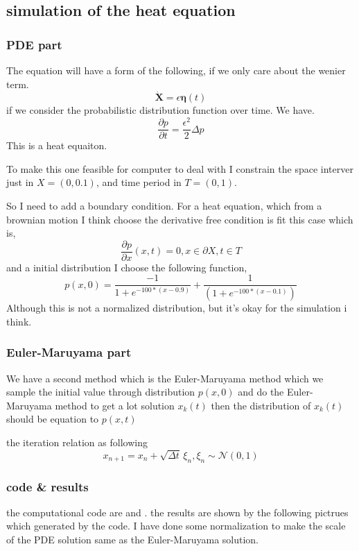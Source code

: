 \documentclass{article}
\theoremstyle{definition} %
\begin{document}
\subsection{simulation of the heat equation}
\subsubsection{PDE part}
The equation will have a form of the following,
if we only care about the wenier term.
\[
    \dot{\mathbf{X}} =  \epsilon\boldsymbol{\eta}(t)
\]
if we consider the probabilistic distribution function
over time. We have.
\[
    \frac{\partial p}{\partial t} = \frac{\epsilon^2}{2}  \Delta p
\]
This is a heat equaiton.

To make this one feasible for computer to
deal with I constrain the space interver
just in \(X=(0,0.1)\), and time period in
\(T=(0,1)\).

So I need to add a boundary condition.
For a heat equation, which from a brownian
motion I think choose the derivative free condition
is fit this case which is,
\[
    \frac{\partial p}{\partial x}(x,t) = 0 , x\in\partial X, t\in T
\]
and a initial distribution I choose the following
function,
\[
    p(x,0)=\frac{-1}{1 + e^{-100 * (x - 0.9)}}+\frac{1}{(1 + e^{-100 * (x - 0.1)})}
\]
Although this is not a normalized distribution,
but it's okay for the simulation i think.


\subsubsection{Euler-Maruyama part}
We have a second method which is the
Euler-Maruyama method which we sample
the initial value through distribution
\(p(x,0)\) and do the Euler-Maruyama
method to get a lot solution
\(x_k(t)\) then the distribution of
\(x_k(t)\) should be equation to
\(p(x,t)\)

the iteration relation as following
\[
    x_{n+1}=x_n+\sqrt{\Delta t}\,\xi_n,\xi_n\sim \mathcal{N}(0, 1)
\]

\subsubsection{code \& results}
the computational code are \cite[Euler-Maruyama]{HEAT-EM} and \cite[PDE]{HEAT-PDE}.
the results are shown by the following pictrues which
generated by the code.
I have done some normalization to make the scale of
the PDE solution same as the Euler-Maruyama solution.
\end{document}
